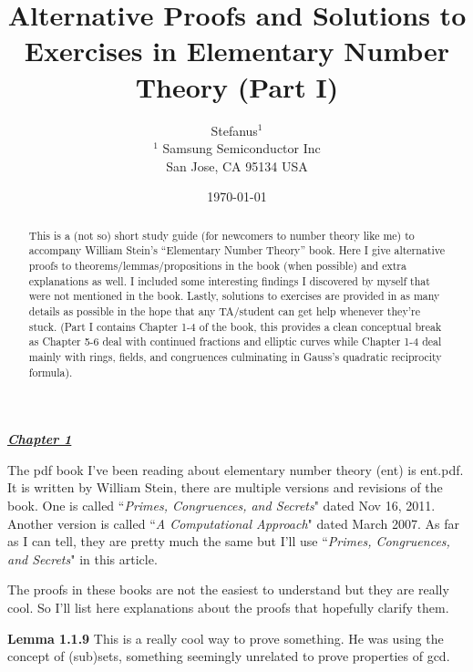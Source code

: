 \documentclass[aps,preprint,preprintnumbers,nofootinbib,showpacs,prd]{revtex4-1}
\begin{document}
\title{Alternative Proofs and Solutions to Exercises in Elementary Number Theory (Part I)}
\bigskip
\author{Stefanus$^1$\\
$^1$ Samsung Semiconductor Inc\\ San Jose, CA 95134 USA\\
}
%
\date{\today}
%
\begin{abstract}
This is a (not so) short study guide (for newcomers to number theory like me) to accompany William Stein's ``Elementary Number Theory'' book. Here I give alternative proofs to theorems/lemmas/propositions in the book (when possible) and extra explanations as well. I included some interesting findings I discovered by myself that were not mentioned in the book. Lastly, solutions to exercises are provided in as many details as possible in the hope that any TA/student can get help whenever they're stuck. (Part I contains Chapter 1-4 of the book, this provides a clean conceptual break as Chapter 5-6 deal with continued fractions and elliptic curves while Chapter 1-4 deal mainly with rings, fields, and congruences culminating in Gauss's quadratic reciprocity formula).

\end{abstract}
%
\maketitle

\renewcommand{\theequation}{A.\arabic{equation}}  %
\setcounter{equation}{0}  %

\underline{\textbf{\textit{Chapter 1}}}
\bigskip

The pdf book I've been reading about elementary number theory (ent) is ent.pdf. It is written by William Stein, there are multiple versions and revisions of the book. One is called ``{\it Primes, Congruences, and Secrets}" dated Nov 16, 2011. Another version is called ``{\it A Computational Approach}" dated March 2007. As far as I can tell, they are pretty much the same but I'll use ``{\it Primes, Congruences, and Secrets}" in this article.

The proofs in these books are not the easiest to understand but they are really cool. So I'll list here explanations about the proofs that hopefully clarify them.

{\bf Lemma 1.1.9} This is a really cool way to prove something. He was using the concept of (sub)sets, something seemingly unrelated to prove properties of gcd.
\end{document}
